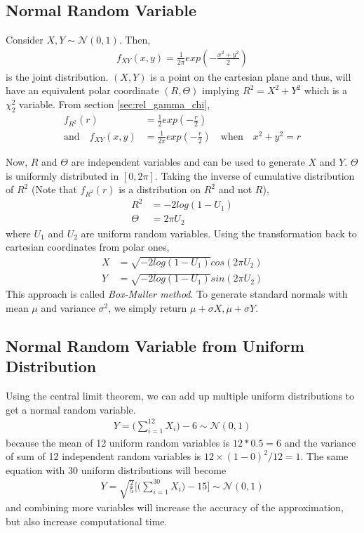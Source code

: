 \documentclass[../probability-notes.tex]{subfiles}
\begin{document}
    \subsection{Normal Random Variable}
    Consider $X, Y \sim \mathcal{N}(0, 1)$. Then,
    \begin{align*}
        f_{XY}(x,y) = \frac{1}{2\pi}exp(-\frac{x^{2}+y^{2}}{2})
    \end{align*}
    is the joint distribution. $(X, Y)$ is a point on the cartesian plane and thus, will have an equivalent polar coordinate $(R, \Theta)$ implying $R^{2} = X^{2} + Y^{2}$ which is a $\chi_{2}^{2}$ variable. From section \ref{sec:rel_gamma_chi},
    \begin{align*}
       f_{R^{2}}(r) &= \frac{1}{2}exp(-\frac{r}{2})\\
       \text{and} \quad f_{XY}(x,y) &= \frac{1}{2\pi} exp(-\frac{r}{2}) \quad \text{when} \quad x^{2} + y^{2} = r
    \end{align*}

    Now, $R$ and $\Theta$ are independent variables and can be used to generate $X$ and $Y$. $\Theta$ is uniformly distributed in $[0, 2\pi]$. Taking the inverse of cumulative distribution of $R^{2}$ (Note that $f_{R^{2}}(r)$ is a distribution on $R^{2}$ and not $R$),
    \begin{align*}
        R^{2} &= -2log(1 - U_{1})\\
        \Theta &= 2\pi U_{2}
    \end{align*}
    where $U_{1}$ and $U_{2}$ are uniform random variables. Using the transformation back to cartesian coordinates from polar ones,
    \begin{align*}
        X &= \sqrt{-2log(1 - U_{1})}cos(2\pi U_{2})\\
        Y &= \sqrt{-2log(1 - U_{1})}sin(2\pi U_{2})
    \end{align*}
    This approach is called \emph{Box-Muller method}. To generate standard normals with mean $\mu$ and variance $\sigma^{2}$, we simply return $\mu + \sigma X, \mu+\sigma Y$.

    
    \subsection{Normal Random Variable from Uniform Distribution}
    Using the central limit theorem, we can add up multiple uniform distributions to get a normal random variable.
    \begin{gather*}
        Y = \bigg(\sum_{i=1}^{12}X_{i} \bigg) - 6 \sim \mathcal{N}(0,1)
    \end{gather*}
    because the mean of 12 uniform random variables is $12 * 0.5 = 6$ and the variance of sum of 12 independent random variables is $12 \times (1-0)^{2}/12 = 1$. The same equation with 30 uniform distributions will become
    \begin{gather*}
        Y = \sqrt{\frac{2}{5}}\bigg[\bigg(\sum_{i=1}^{30}X_{i} \bigg) - 15\bigg] \sim \mathcal{N}(0,1)
    \end{gather*}
    and combining more variables will increase the accuracy of the approximation, but also increase computational time.
\end{document}
